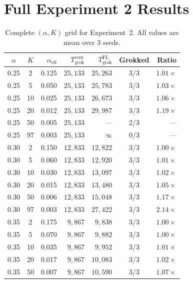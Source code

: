 \documentclass{article}
\begin{document}
\appendix
\section{Full Experiment 2 Results}
\label{app:exp2}

\begin{table}[h]
\centering
\small
\caption{Complete $(\alpha, K)$ grid for Experiment~2. All values are mean over 3 seeds.}
\label{tab:exp2_full}
\begin{tabular}{ccrrrcr}
\toprule
$\alpha$ & $K$ & $\alpha_{\mathrm{eff}}$ & $T_{\mathrm{grok}}^{\mathrm{cent}}$ & $T_{\mathrm{grok}}^{\mathrm{FL}}$ & Grokked & Ratio \\
\midrule
0.25 &  2 & 0.125 & $25{,}133$ & $25{,}263$ & 3/3 & $1.01\times$ \\
0.25 &  5 & 0.050 & $25{,}133$ & $25{,}783$ & 3/3 & $1.03\times$ \\
0.25 & 10 & 0.025 & $25{,}133$ & $26{,}673$ & 3/3 & $1.06\times$ \\
0.25 & 20 & 0.012 & $25{,}133$ & $29{,}987$ & 3/3 & $1.19\times$ \\
0.25 & 50 & 0.005 & $25{,}133$ & --- & 2/3 & --- \\
0.25 & 97 & 0.003 & $25{,}133$ & $\infty$ & 0/3 & --- \\
\midrule
0.30 &  2 & 0.150 & $12{,}833$ & $12{,}822$ & 3/3 & $1.00\times$ \\
0.30 &  5 & 0.060 & $12{,}833$ & $12{,}920$ & 3/3 & $1.01\times$ \\
0.30 & 10 & 0.030 & $12{,}833$ & $13{,}097$ & 3/3 & $1.02\times$ \\
0.30 & 20 & 0.015 & $12{,}833$ & $13{,}480$ & 3/3 & $1.05\times$ \\
0.30 & 50 & 0.006 & $12{,}833$ & $15{,}048$ & 3/3 & $1.17\times$ \\
0.30 & 97 & 0.003 & $12{,}833$ & $27{,}422$ & 3/3 & $2.14\times$ \\
\midrule
0.35 &  2 & 0.175 & $9{,}867$ & $9{,}838$ & 3/3 & $1.00\times$ \\
0.35 &  5 & 0.070 & $9{,}867$ & $9{,}882$ & 3/3 & $1.00\times$ \\
0.35 & 10 & 0.035 & $9{,}867$ & $9{,}952$ & 3/3 & $1.01\times$ \\
0.35 & 20 & 0.017 & $9{,}867$ & $10{,}083$ & 3/3 & $1.02\times$ \\
0.35 & 50 & 0.007 & $9{,}867$ & $10{,}590$ & 3/3 & $1.07\times$ \\

\end{tabular}
\end{table}
\end{document}
